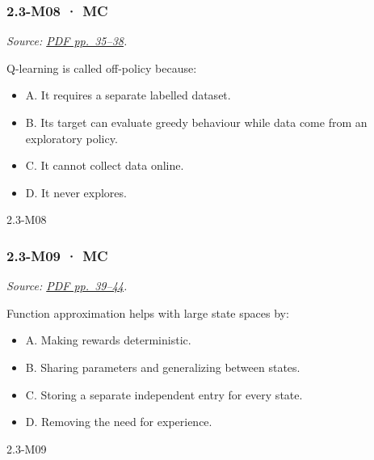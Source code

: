 \noindent\begin{minipage}{\linewidth}

\subsubsection{2.3-M08 · MC}\label{m08-mc-5}

\emph{Source:
\href{../Lecture\%20Slides/2.3.\%20Q-learning.pdf\#page=35}{PDF
pp.~35--38}.}

Q-learning is called off-policy because:

\begin{itemize}
\tightlist
\item
  A. It requires a separate labelled dataset.
\item
  B. Its target can evaluate greedy behaviour while data come from an
  exploratory policy.
\item
  C. It cannot collect data online.
\item
  D. It never explores.
\end{itemize}

\begin{solution}[8mm]{2.3-M08}

\end{solution}
\end{minipage}\par\medskip

\noindent\begin{minipage}{\linewidth}

\subsubsection{2.3-M09 · MC}\label{m09-mc-5}

\emph{Source:
\href{../Lecture\%20Slides/2.3.\%20Q-learning.pdf\#page=39}{PDF
pp.~39--44}.}

Function approximation helps with large state spaces by:

\begin{itemize}
\tightlist
\item
  A. Making rewards deterministic.
\item
  B. Sharing parameters and generalizing between states.
\item
  C. Storing a separate independent entry for every state.
\item
  D. Removing the need for experience.
\end{itemize}

\begin{solution}[8mm]{2.3-M09}

\end{solution}
\end{minipage}\par\medskip

